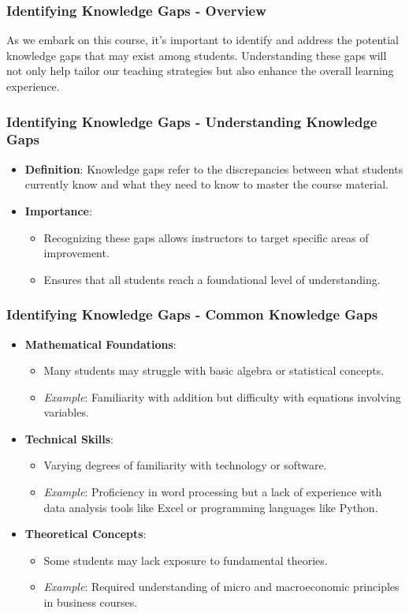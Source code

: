 \documentclass[aspectratio=169]{beamer}
\begin{document}
\begin{frame}[fragile]
  \frametitle{Identifying Knowledge Gaps - Overview}
  As we embark on this course, it's important to identify and address the potential knowledge gaps that may exist among students. 
  Understanding these gaps will not only help tailor our teaching strategies but also enhance the overall learning experience.
\end{frame}

\begin{frame}[fragile]
  \frametitle{Identifying Knowledge Gaps - Understanding Knowledge Gaps}
  \begin{itemize}
    \item \textbf{Definition}: Knowledge gaps refer to the discrepancies between what students currently know and what they need to know to master the course material.
    
    \item \textbf{Importance}: 
    \begin{itemize}
      \item Recognizing these gaps allows instructors to target specific areas of improvement.
      \item Ensures that all students reach a foundational level of understanding.
    \end{itemize}
  \end{itemize}
\end{frame}

\begin{frame}[fragile]
  \frametitle{Identifying Knowledge Gaps - Common Knowledge Gaps}
  \begin{itemize}
    \item \textbf{Mathematical Foundations}: 
      \begin{itemize}
        \item Many students may struggle with basic algebra or statistical concepts.
        \item \textit{Example}: Familiarity with addition but difficulty with equations involving variables.
      \end{itemize}
    
    \item \textbf{Technical Skills}: 
      \begin{itemize}
        \item Varying degrees of familiarity with technology or software.
        \item \textit{Example}: Proficiency in word processing but a lack of experience with data analysis tools like Excel or programming languages like Python.
      \end{itemize}

    \item \textbf{Theoretical Concepts}: 
      \begin{itemize}
        \item Some students may lack exposure to fundamental theories.
        \item \textit{Example}: Required understanding of micro and macroeconomic principles in business courses.
      \end{itemize}
  \end{itemize}
\end{frame}
\end{document}
